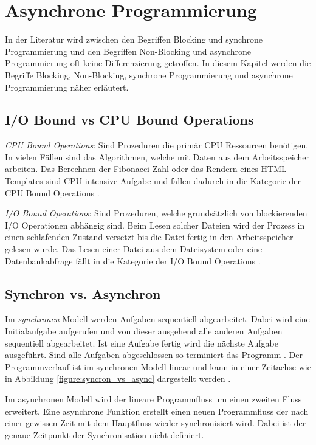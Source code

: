 \section{Asynchrone Programmierung}

In der Literatur wird zwischen den Begriffen Blocking und synchrone Programmierung und den Begriffen Non-Blocking und asynchrone Programmierung oft keine Differenzierung getroffen. In diesem Kapitel werden die Begriffe Blocking, Non-Blocking, synchrone Programmierung und asynchrone Programmierung näher erläutert. 

\subsection{I/O Bound vs CPU Bound Operations}

\emph{CPU Bound Operations}: Sind Prozeduren die primär CPU Ressourcen benötigen. In vielen Fällen sind das Algorithmen, welche mit Daten aus dem Arbeitsspeicher arbeiten. Das Berechnen der Fibonacci Zahl oder das Rendern eines HTML Templates sind CPU intensive Aufgabe und fallen dadurch in die Kategorie der CPU Bound Operations \cite[p. 70]{Erb2012}. 

\emph{I/O Bound Operations}: Sind Prozeduren, welche grundsätzlich von blockierenden I/O Operationen abhängig sind. Beim Lesen solcher Dateien wird der Prozess in einen schlafenden Zustand versetzt bis die Datei fertig in den Arbeitsspeicher gelesen wurde. Das Lesen einer Datei aus dem Dateisystem oder eine Datenbankabfrage fällt in die Kategorie der I/O Bound Operations \cite[p. 70]{Erb2012}. 

\subsection{Synchron vs. Asynchron}

Im \emph{synchronen} Modell werden Aufgaben sequentiell abgearbeitet. Dabei wird eine Initialaufgabe aufgerufen und von dieser ausgehend alle anderen Aufgaben sequentiell abgearbeitet. Ist eine Aufgabe fertig wird die nächste Aufgabe ausgeführt. Sind alle Aufgaben abgeschlossen so terminiert das Programm . Der Programmverlauf ist im synchronen Modell linear und kann in einer Zeitachse wie in Abbildung \ref{figure:syncron_vs_async} dargestellt werden \cite[]{Pet2015}.

Im asynchronen Modell wird der lineare Programmfluss um einen zweiten Fluss erweitert. Eine asynchrone Funktion erstellt einen neuen Programmfluss der nach einer gewissen Zeit mit dem Hauptfluss wieder synchronisiert wird. Dabei ist der genaue Zeitpunkt der Synchronisation nicht definiert. 

